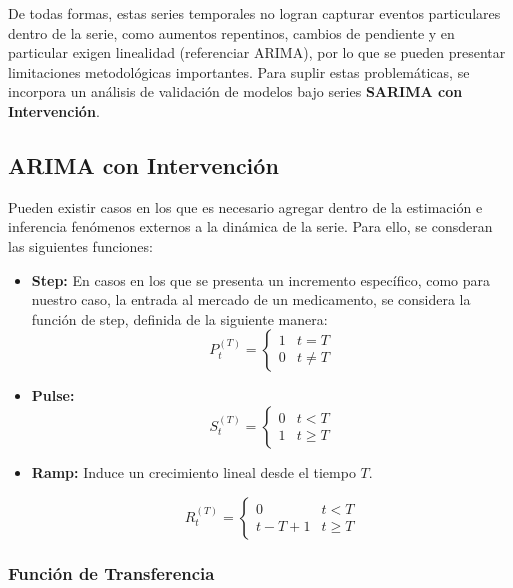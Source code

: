 \documentclass[10pt,twoside,xcolor=table,x11anmes]{IEEEtran}
\begin{document}
De todas formas, estas series temporales no logran capturar eventos particulares dentro de la serie, como aumentos repentinos, cambios de pendiente y en particular exigen linealidad (referenciar ARIMA), por lo que se pueden presentar limitaciones metodológicas importantes. Para suplir estas problemáticas, se incorpora un análisis de validación de modelos bajo series \textbf{SARIMA con Intervención}.

\subsection[ARIMA con Intervención]{ARIMA con Intervención}

Pueden existir casos en los que es necesario agregar dentro de la estimación e inferencia fenómenos externos a la dinámica de la serie. Para ello, se consderan las siguientes funciones:

\begin{itemize}
    \item \textbf{Step:} En casos en los que se presenta un incremento específico, como para nuestro caso, la entrada al mercado de un medicamento, se considera la función de step, definida de la siguiente manera:\begin{equation}
  P_t^{(T)} =
  \begin{cases}
    1 & t = T \\
    0 & t \neq T
  \end{cases}
\end{equation}

\item \textbf{Pulse:} \begin{equation}
  S_t^{(T)} =
  \begin{cases}
    0 & t < T \\
    1 & t \geq T
  \end{cases}
\end{equation}

\item \textbf{Ramp:} Induce un crecimiento lineal desde el tiempo $T$.

\begin{equation}
  R_t^{(T)} =
  \begin{cases}
    0 & t < T \\
    t - T + 1 & t \geq T
  \end{cases}
\end{equation}
\end{itemize}

\subsubsection{Función de Transferencia}
\end{document}
